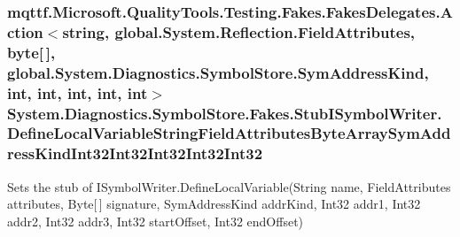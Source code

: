 \hypertarget{class_system_1_1_diagnostics_1_1_symbol_store_1_1_fakes_1_1_stub_i_symbol_writer_a2f0e49009c97648aa763b4f4f65aa5b4}{
\subsubsection[{Define\-Local\-Variable\-String\-Field\-Attributes\-Byte\-Array\-Sym\-Address\-Kind\-Int32\-Int32\-Int32\-Int32\-Int32}]{\setlength{\rightskip}{0pt plus 5cm}mqttf.\-Microsoft.\-Quality\-Tools.\-Testing.\-Fakes.\-Fakes\-Delegates.\-Action$<$string, global.\-System.\-Reflection.\-Field\-Attributes, byte\mbox{[}$\,$\mbox{]}, global.\-System.\-Diagnostics.\-Symbol\-Store.\-Sym\-Address\-Kind, int, int, int, int, int$>$ System.\-Diagnostics.\-Symbol\-Store.\-Fakes.\-Stub\-I\-Symbol\-Writer.\-Define\-Local\-Variable\-String\-Field\-Attributes\-Byte\-Array\-Sym\-Address\-Kind\-Int32\-Int32\-Int32\-Int32\-Int32}}\label{class_system_1_1_diagnostics_1_1_symbol_store_1_1_fakes_1_1_stub_i_symbol_writer_a2f0e49009c97648aa763b4f4f65aa5b4}


Sets the stub of I\-Symbol\-Writer.\-Define\-Local\-Variable(\-String name, Field\-Attributes attributes, Byte\mbox{[}$\,$\mbox{]} signature, Sym\-Address\-Kind addr\-Kind, Int32 addr1, Int32 addr2, Int32 addr3, Int32 start\-Offset, Int32 end\-Offset)

